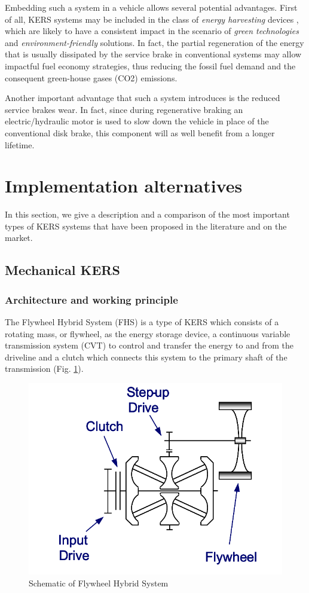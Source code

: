 \documentclass[11pt]{article}
\begin{document}
Embedding such a system in a vehicle allows several potential advantages. First of all, KERS systems may be included in the class of \textit{energy harvesting} devices \cite{c}, which are likely to have a consistent impact in the scenario of \textit{green technologies} and \textit{environment-friendly} solutions. In fact, the partial regeneration of the energy that is usually dissipated by the service brake in conventional systems may allow impactful fuel economy strategies, thus reducing the fossil fuel demand and the consequent green-house gases (CO2) emissions. 

Another important advantage that such a system introduces is the reduced service brakes wear. In fact, since during regenerative braking an electric/hydraulic motor is used to slow down the vehicle in place of the conventional disk brake, this component will as well benefit from a longer lifetime. 

\section{Implementation alternatives}

In this section, we give a description and a comparison of the most important types of KERS systems that have been proposed in the literature and on the market.

\subsection{Mechanical KERS}

\subsubsection{Architecture and working principle}

The Flywheel Hybrid System (FHS) is a type of KERS which consists of a rotating mass, or flywheel, as the energy storage device, a continuous variable transmission system (CVT) to control and transfer the energy to and from the driveline and a clutch which connects this system to the primary shaft of the transmission (Fig. \ref{fig: FHS}). 

\begin{figure}[H]
\centering
\includegraphics[width=.6\textwidth]{Images/State_of_the_art/Mechanical_KERS.png}
\caption{Schematic of Flywheel Hybrid System}
\label{fig: FHS}
\end{figure}
\end{document}
